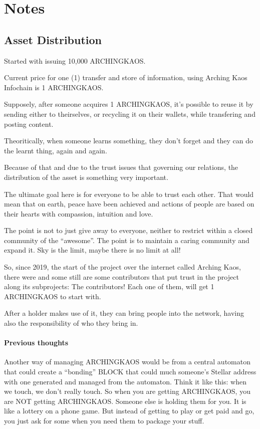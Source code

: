 \documentclass[10pt,a4paper]{paper}
\begin{document}
	
\section{Notes}\label{notes}

	\subsection{Asset Distribution}\label{asset-distribution}

Started with issuing 10,000 ARCHINGKAOS.

Current price for one (1) transfer and store of information, using
Arching Kaos Infochain is 1 ARCHINGKAOS.

Supposely, after someone acquires 1 ARCHINGKAOS, it's possible to reuse
it by sending either to theirselves, or recycling it on their wallets,
while transfering and posting content.

Theoritically, when someone learns something, they don't forget and they
can do the learnt thing, again and again.

Because of that and due to the trust issues that governing our
relations, the distribution of the asset is something very important.

The ultimate goal here is for everyone to be able to trust each other.
That would mean that on earth, peace have been achieved and actions of
people are based on their hearts with compassion, intuition and love.

The point is not to just give away to everyone, neither to restrict
within a closed community of the ``awesome''. The point is to maintain a
caring community and expand it. Sky is the limit, maybe there is no
limit at all!

So, since 2019, the start of the project over the internet called
Arching Kaos, there were and some still are some contributors that put
trust in the project along its subprojects: The contributors! Each one
of them, will get 1 ARCHINGKAOS to start with.

After a holder makes use of it, they can bring people into the network,
having also the responsibility of who they bring in.

	\paragraph{Previous thoughts}\label{previous-thoughts}

Another way of managing ARCHINGKAOS would be from a central automaton
that could create a ``bonding'' BLOCK that could much someone's Stellar
address with one generated and managed from the automaton. Think it like
this: when we touch, we don't really touch. So when you are getting
ARCHINGKAOS, you are NOT getting ARCHINGKAOS. Someone else is holding
them for you. It is like a lottery on a phone game. But instead of
getting to play or get paid and go, you just ask for some when you need
them to package your stuff.
\end{document}
